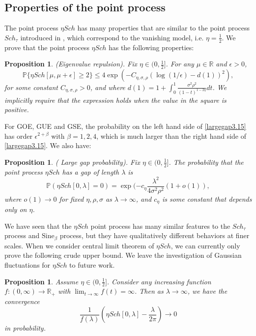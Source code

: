 \documentclass[12pt, reqno]{amsart}
\newtheorem{proposition}[theorem]{Proposition}
\theoremstyle{definition}
\theoremstyle{remark}
\numberwithin{equation}{section}
\begin{document}
\subsection{Properties of the point process}

The point process $\eta Sch$ has many properties that are similar to the point process $Sch_\tau$ introduced in \cite{kritchevski2011scaling}, which correspond to the vanishing model, i.e. $\eta=\frac{1}{2}$. We prove that the point process $\eta Sch$ has the following properties:

\begin{proposition}\label{prop1.5}(Eigenvalue repulsion).
Fix $\eta\in(0,\frac{1}{2}]$. For any $\mu\in\mathbb{R}$ and $\epsilon>0$,
    \begin{equation}\label{largegap3.15}
        \mathbb{P}\{\eta Sch[\mu,\mu+\epsilon]\geq 2\}\leq 4\exp(-C_{\eta,\sigma,\rho}(\log(1/\epsilon)-d(1))^2),
    \end{equation}
    for some constant $C_{\eta,\sigma,\rho}>0$, and where $d(1)=1+\int_0^1 \frac{\sigma^2\rho^2}{(1-t)^{1-2\eta}}dt$. We implicitly require that the expression holds when the value in the square is positive. 
\end{proposition}
For GOE, GUE and GSE, the probability on the left hand side of \eqref{largegap3.15} has order $\epsilon^{2+\beta}$ with $\beta=1,2,4$, which is much larger than the right hand side of \eqref{largegap3.15}. We also have:

    \begin{proposition}\label{prop1.6}
  ( Large gap probability). Fix $\eta\in(0,\frac{1}{2}]$. The probability that the point process $\eta Sch$ has a gap of length $\lambda$ is
$$\mathbb{P}(\eta Sch[0,\lambda]=0)=\exp(-c_\eta \frac{\lambda^2}{4\sigma^2\rho^2}(1+o(1)),$$
   where $o(1)\to 0$ for fixed $\eta,\rho,\sigma$ as $\lambda\to \infty$, and $c_\eta$ is some constant that depends only on $\eta$.
\end{proposition}


We have seen that the $\eta Sch$ point process has many similar features to the $Sch_\tau$ process and $\text{Sine}_\beta$ process, but they have qualitatively different behaviors at finer scales. When we consider central limit theorem of  $\eta Sch$, we can currently only prove the following crude upper bound. We leave the investigation of Gaussian fluctuations for $\eta Sch$ to future work.

   \begin{proposition}\label{prop1.7} Assume $\eta\in(0,\frac{1}{2}]$.
    Consider any increasing function $f:(0,\infty)\to\mathbb{R}_+$ with $\lim_{t\to\infty}f(t)=\infty$. Then as $\lambda\to\infty$, we have the convergence
$$\frac{1}{f(\lambda)}\left(\eta Sch[0,\lambda]-\frac{\lambda}{2\pi}\right)\to 0$$ in probability.
\end{proposition}
\end{document}
